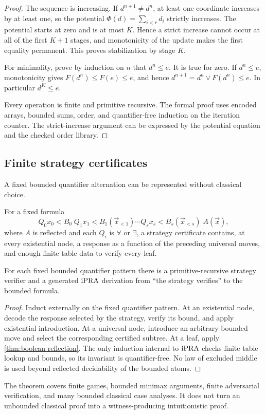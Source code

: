 \begin{proof}
The sequence is increasing.  If \(d^{n+1}\ne d^n\), at least one coordinate
increases by at least one, so the potential
\(\Phi(d)=\sum_{i<r}d_i\) strictly increases.  The potential starts at zero
and is at most \(K\).  Hence a strict increase cannot occur at all of the first
\(K+1\) stages, and monotonicity of the update makes the first equality
permanent.  This proves stabilization by stage \(K\).

For minimality, prove by induction on \(n\) that \(d^n\le e\).  It is true for
zero.  If \(d^n\le e\), monotonicity gives \(F(d^n)\le F(e)\le e\), and hence
\(d^{n+1}=d^n\vee F(d^n)\le e\).  In particular \(d^K\le e\).

Every operation is finite and primitive recursive.  The formal proof uses
encoded arrays, bounded sums, order, and quantifier-free induction on the
iteration counter.  The strict-increase argument can be expressed by the
potential equation and the checked order library.
\end{proof}

\subsection{Finite strategy certificates}

A fixed bounded quantifier alternation can be represented without classical
choice.

\begin{definition}
For a fixed formula
\[
 Q_0x_0<B_0\;Q_1x_1<B_1(\vec x_{<1})\cdots
 Q_sx_s<B_s(\vec x_{<s})\;A(\vec x),
\]
where \(A\) is reflected and each \(Q_i\) is \(\forall\) or \(\exists\), a
strategy certificate contains, at every existential node, a response as a
function of the preceding universal moves, and enough finite table data to
verify every leaf.
\end{definition}

\begin{theorem}
\label{thm:strategy}
For each fixed bounded quantifier pattern there is a primitive-recursive
strategy verifier and a generated \(\mathrm{iPRA}\) derivation from ``the strategy
verifies'' to the bounded formula.
\end{theorem}

\begin{proof}
Induct externally on the fixed quantifier pattern.  At an existential node,
decode the response selected by the strategy, verify its bound, and apply
existential introduction.  At a universal node, introduce an arbitrary bounded
move and select the corresponding certified subtree.  At a leaf, apply
\cref{thm:boolean-reflection}.  The only induction internal to \(\mathrm{iPRA}\) checks
finite table lookup and bounds, so its invariant is quantifier-free.  No law of
excluded middle is used beyond reflected decidability of the bounded atoms.
\end{proof}

The theorem covers finite games, bounded minimax arguments, finite adversarial
verification, and many bounded classical case analyses.  It does not turn an
unbounded classical proof into a witness-producing intuitionistic proof.
